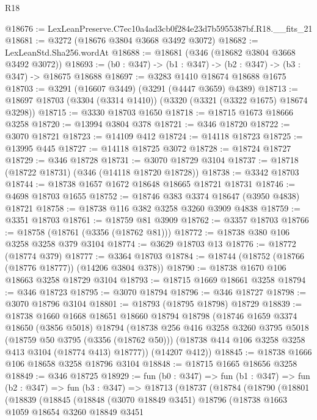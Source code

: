 \begin{lexlean}{R18}
\begin{coremodule}
@18676 := LexLeanPreserve.C7ec10a4ad3cb0f284e23d7b5955387bf.R18.__fits_21
@18681 := @3272 (@18676 @3804 @3668 @3492 @3072)
@18682 := LexLeanStd.Sha256.wordAt
@18688 := @18681 (@346 (@18682 @3804 @3668 @3492 @3072))
@18693 := (b0 : @347) -> (b1 : @347) -> (b2 : @347) -> (b3 : @347) -> @18675 @18688
@18697 := @3283 @1410 @18674 @18688 @1675
@18703 := @3291 (@16607 @3449) (@3291 (@4447 @3659) @4389)
@18713 := @18697 @18703 (@3304 (@3314 @1410)) (@3320 (@3321 (@3322 @1675) @18674 @3298))
@18715 := @3330 @18703 @1650
@18718 := @18715 @1673 @18666 @3258
@18720 := @13994 @3804 @378
@18721 := @346 @18720
@18722 := @3070 @18721
@18723 := @14109 @412
@18724 := @14118 @18723
@18725 := @13995 @445
@18727 := @14118 @18725 @3072
@18728 := @18724 @18727
@18729 := @346 @18728
@18731 := @3070 @18729 @3104
@18737 := @18718 (@18722 @18731) (@346 (@14118 @18720 @18728))
@18738 := @3342 @18703
@18744 := @18738 @1657 @1672 @18648 @18665 @18721 @18731
@18746 := @4698 @18703 @1655
@18752 := @18746 @383 @3374 @18647 (@3950 @4838) @18721
@18758 := @18738 @116 @382 @3258 @3260 @3909 @4838
@18759 := @3351 @18703
@18761 := @18759 @81 @3909
@18762 := @3357 @18703
@18766 := @18758 (@18761 (@3356 (@18762 @81)))
@18772 := @18738 @380 @106 @3258 @3258 @379 @3104
@18774 := @3629 @18703 @13
@18776 := @18772 (@18774 @379)
@18777 := @3364 @18703
@18784 := @18744 (@18752 (@18766 (@18776 @18777)) (@14206 @3804 @378))
@18790 := @18738 @1670 @106 @18663 @3258 @18729 @3104
@18793 := @18715 @1669 @18661 @3258
@18794 := @346 @18723
@18795 := @3070 @18794
@18796 := @346 @18727
@18798 := @3070 @18796 @3104
@18801 := @18793 (@18795 @18798) @18729
@18839 := @18738
    @1660
    @1668
    @18651
    @18660
    @18794
    @18798
    (@18746
      @1659
      @3374
      @18650
      (@3856 @5018)
      @18794
      (@18738
        @256
        @416
        @3258
        @3260
        @3795
        @5018
        (@18759 @50 @3795 (@3356 (@18762 @50)))
        (@18738 @414 @106 @3258 @3258 @413 @3104 (@18774 @413) @18777))
      (@14207 @412))
@18845 := @18738 @1666 @106 @18658 @3258 @18796 @3104
@18848 := @18715 @1665 @18656 @3258
@18849 := @346 @18725
@18929 := fun (b0 : @347) =>
  fun (b1 : @347) =>
  fun (b2 : @347) =>
  fun (b3 : @347) =>
  @18713
    (@18737
      (@18784
        (@18790
          (@18801
            (@18839
              (@18845
                (@18848
                  (@3070 @18849 @3451)
                  @18796
                  (@18738
                    @1663
                    @1059
                    @18654
                    @3260
                    @18849
                    @3451

\end{coremodule}
\end{lexlean}
